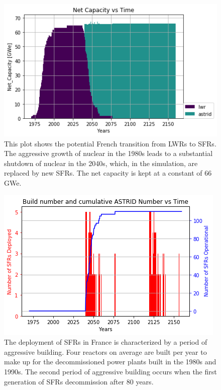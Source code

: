\begin{figure}[htbp!]
        \begin{center}
                \includegraphics[scale=0.6]{./images/french-transition/power_plot.png}
        \end{center}
        \caption{This plot shows the potential French transition from \glspl{LWR} to \glspl{SFR}.
                 The aggressive growth of nuclear in the 1980s leads to a substantial shutdown
                 of nuclear in the 2040s, which, in the simulation, are replaced by new 
                 \glspl{SFR}. The net capacity is kept at a constant of 66 GWe.}
        \label{fig:sfr_num}
\end{figure}
\begin{figure}[htbp!]
    \begin{center}
        \includegraphics[scale=0.6]{./images/french-transition/sfr_deploy.png}
    \end{center}
    \caption{The deployment of \glspl{SFR} in France is characterized by a period of
             aggressive building. Four reactors on average are built per year to
             make up for the decommissioned power plants built in the 1980s and 1990s.
             The second period of aggressive building occurs when the first generation
             of \glspl{SFR} decommission after 80 years.}
    \label{fig:dep}
\end{figure}

